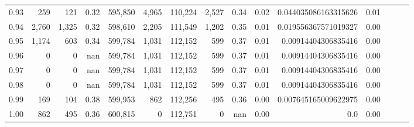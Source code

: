 \begin{tabular}{rrrrrrrrrrrrrrr}
0.93 &     259 &     121 &  0.32 &  595,850 &    4,965 &  110,224 &    2,527 &  0.34 &  0.02 &  0.044035086163315626 &      0.01 \\
0.94 &   2,760 &   1,325 &  0.32 &  598,610 &    2,205 &  111,549 &    1,202 &  0.35 &  0.01 &  0.019556367571019327 &      0.00 \\
0.95 &   1,174 &     603 &  0.34 &  599,784 &    1,031 &  112,152 &      599 &  0.37 &  0.01 &   0.00914404306835416 &      0.00 \\
0.96 &       0 &       0 &   nan &  599,784 &    1,031 &  112,152 &      599 &  0.37 &  0.01 &   0.00914404306835416 &      0.00 \\
0.97 &       0 &       0 &   nan &  599,784 &    1,031 &  112,152 &      599 &  0.37 &  0.01 &   0.00914404306835416 &      0.00 \\
0.98 &       0 &       0 &   nan &  599,784 &    1,031 &  112,152 &      599 &  0.37 &  0.01 &   0.00914404306835416 &      0.00 \\
0.99 &     169 &     104 &  0.38 &  599,953 &      862 &  112,256 &      495 &  0.36 &  0.00 &  0.007645165009622975 &      0.00 \\
1.00 &     862 &     495 &  0.36 &  600,815 &        0 &  112,751 &        0 &   nan &  0.00 &                   0.0 &      0.00 \\
\bottomrule
\end{tabular}
